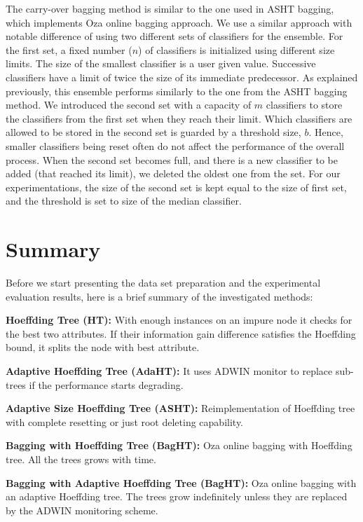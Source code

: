 The carry-over bagging method is similar to the one used in ASHT bagging, which implements Oza online bagging approach. We use a similar approach with notable difference of using two different sets of classifiers for the ensemble. For the first set, a fixed number ($n$) of classifiers is initialized using different  size limits. The size of the smallest classifier is a user given value. Successive classifiers have a limit of twice the size of its immediate predecessor. As explained previously, this ensemble performs similarly to the one from the ASHT bagging method. We introduced the second set with a capacity of $m$ classifiers to store the classifiers from the first set when they reach their limit. Which classifiers are allowed to be stored in the second set is guarded by a threshold size, $b$. Hence, smaller classifiers being reset often do not affect the performance of the overall process. When the second set becomes full, and there is a new classifier to be added (that reached its limit), we deleted the oldest one from the set. For our experimentations, the size of the second set is kept equal to the size of first set, and the threshold is set to size of the median classifier. 


\section{Summary}
Before we start presenting the data set preparation and the experimental evaluation results, here is a brief summary of the investigated methods:

\textbf{Hoeffding Tree (HT):} With enough instances on an impure node it checks for the best two attributes. If their information gain difference satisfies the Hoeffding bound, it splits the node with best attribute.

\textbf{Adaptive Hoeffding Tree (AdaHT):} It uses ADWIN monitor to replace sub-trees if the performance starts degrading.

\textbf{Adaptive Size Hoeffding Tree (ASHT):} Reimplementation of Hoeffding tree with complete resetting or just root deleting capability.

\textbf{Bagging with Hoeffding Tree (BagHT):} Oza online bagging with Hoeffding tree. All the trees grows with time.

\textbf{Bagging with Adaptive Hoeffding Tree (BagHT):} Oza online bagging with an adaptive Hoeffding tree. The trees grow indefinitely unless they are replaced by the ADWIN monitoring scheme.

